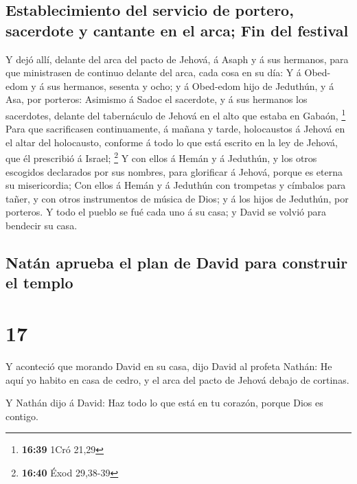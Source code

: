 \hypertarget{establecimiento-del-servicio-de-portero-sacerdote-y-cantante-en-el-arca-fin-del-festival}{%
\subsection{Establecimiento del servicio de portero, sacerdote y
cantante en el arca; Fin del
festival}\label{establecimiento-del-servicio-de-portero-sacerdote-y-cantante-en-el-arca-fin-del-festival}}

 Y dejó allí, delante del arca del pacto de Jehová, á
Asaph y á sus hermanos, para que ministrasen de continuo delante del
arca, cada cosa en su día:  Y á Obed-edom y á sus
hermanos, sesenta y ocho; y á Obed-edom hijo de Jeduthún, y á Asa, por
porteros:  Asimismo á Sadoc el sacerdote, y á sus
hermanos los sacerdotes, delante del tabernáculo de Jehová en el alto
que estaba en Gabaón, \footnote{\textbf{16:39} 1Cró 21,29}
 Para que sacrificasen continuamente, á mañana y tarde,
holocaustos á Jehová en el altar del holocausto, conforme á todo lo que
está escrito en la ley de Jehová, que él prescribió á Israel;
\footnote{\textbf{16:40} Éxod 29,38-39}  Y con ellos á
Hemán y á Jeduthún, y los otros escogidos declarados por sus nombres,
para glorificar á Jehová, porque es eterna su misericordia;
 Con ellos á Hemán y á Jeduthún con trompetas y címbalos
para tañer, y con otros instrumentos de música de Dios; y á los hijos de
Jeduthún, por porteros.  Y todo el pueblo se fué cada uno
á su casa; y David se volvió para bendecir su casa.

\hypertarget{natuxe1n-aprueba-el-plan-de-david-para-construir-el-templo}{%
\subsection{Natán aprueba el plan de David para construir el
templo}\label{natuxe1n-aprueba-el-plan-de-david-para-construir-el-templo}}

\hypertarget{section-16}{%
\section{17}\label{section-16}}

 Y aconteció que morando David en su casa, dijo David al
profeta Nathán: He aquí yo habito en casa de cedro, y el arca del pacto
de Jehová debajo de cortinas.

 Y Nathán dijo á David: Haz todo lo que está en tu
corazón, porque Dios es contigo.

